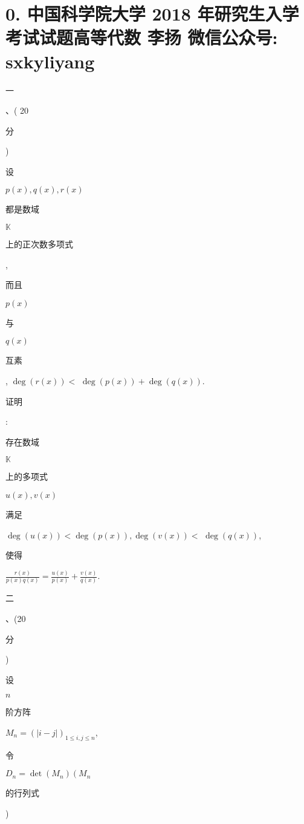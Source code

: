 \documentclass[10pt]{article}
\begin{document}
\section{0. 中国科学院大学 2018 年研究生入学考试试题高等代数 李扬 微信公众号: sxkyliyang}
\begin{CJK}{UTF8}{mj}一\end{CJK}、( 20 \begin{CJK}{UTF8}{mj}分\end{CJK}) \begin{CJK}{UTF8}{mj}设\end{CJK} $p(x), q(x), r(x)$ \begin{CJK}{UTF8}{mj}都是数域\end{CJK} $\mathbb{K}$ \begin{CJK}{UTF8}{mj}上的正次数多项式\end{CJK}, \begin{CJK}{UTF8}{mj}而且\end{CJK} $p(x)$ \begin{CJK}{UTF8}{mj}与\end{CJK} $q(x)$ \begin{CJK}{UTF8}{mj}互素\end{CJK}, $\operatorname{deg}(r(x))<$ $\operatorname{deg}(p(x))+\operatorname{deg}(q(x))$. \begin{CJK}{UTF8}{mj}证明\end{CJK}: \begin{CJK}{UTF8}{mj}存在数域\end{CJK} $\mathbb{K}$ \begin{CJK}{UTF8}{mj}上的多项式\end{CJK} $u(x), v(x)$ \begin{CJK}{UTF8}{mj}满足\end{CJK} $\operatorname{deg}(u(x))<\operatorname{deg}(p(x)), \operatorname{deg}(v(x))<$ $\operatorname{deg}(q(x))$, \begin{CJK}{UTF8}{mj}使得\end{CJK} $\frac{r(x)}{p(x) q(x)}=\frac{u(x)}{p(x)}+\frac{v(x)}{q(x)}$.

\begin{CJK}{UTF8}{mj}二\end{CJK}、(20 \begin{CJK}{UTF8}{mj}分\end{CJK}) \begin{CJK}{UTF8}{mj}设\end{CJK} $n$ \begin{CJK}{UTF8}{mj}阶方阵\end{CJK} $M_{n}=(|i-j|)_{1 \leq i, j \leq n}$, \begin{CJK}{UTF8}{mj}令\end{CJK} $D_{n}=\operatorname{det}\left(M_{n}\right)\left(M_{n}\right.$ \begin{CJK}{UTF8}{mj}的行列式\end{CJK})
\end{document}
